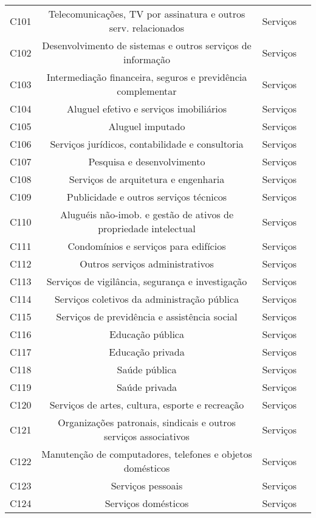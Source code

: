 \begin{apendicesenv}
\begin{small}
\begin{center}
\begin{longtable}{lccc}
				C101 & Telecomunicações, TV por assinatura e outros serv. relacionados & Serviços \\
				C102 & Desenvolvimento de sistemas e outros serviços de informação & Serviços \\
				C103 & Intermediação financeira, seguros e previdência complementar & Serviços \\
				C104 & Aluguel efetivo e serviços imobiliários & Serviços \\
				C105 & Aluguel imputado & Serviços \\
				C106 & Serviços jurídicos, contabilidade e consultoria & Serviços \\
				C107 & Pesquisa e desenvolvimento & Serviços \\
				C108 & Serviços de arquitetura e engenharia & Serviços \\
				C109 & Publicidade e outros serviços técnicos & Serviços \\
				C110 & Aluguéis não-imob. e gestão de ativos de propriedade intelectual & Serviços \\
				C111 & Condomínios e serviços para edifícios & Serviços \\
				C112 & Outros serviços administrativos & Serviços \\
				C113 & Serviços de vigilância, segurança e investigação & Serviços \\
				C114 & Serviços coletivos da administração pública & Serviços \\
				C115 & Serviços de previdência e assistência social & Serviços \\
				C116 & Educação pública & Serviços \\
				C117 & Educação privada & Serviços \\
				C118 & Saúde pública & Serviços \\
				C119 & Saúde privada & Serviços \\
				C120 & Serviços de artes, cultura, esporte e recreação & Serviços \\
				C121 & Organizações patronais, sindicais e outros serviços associativos & Serviços \\
				C122 & Manutenção de computadores, telefones e objetos domésticos & Serviços \\
				C123 & Serviços pessoais & Serviços \\
				C124 & Serviços domésticos & Serviços \\ \hline
			\end{longtable}
		\end{center}
	\end{small}



\end{apendicesenv}
